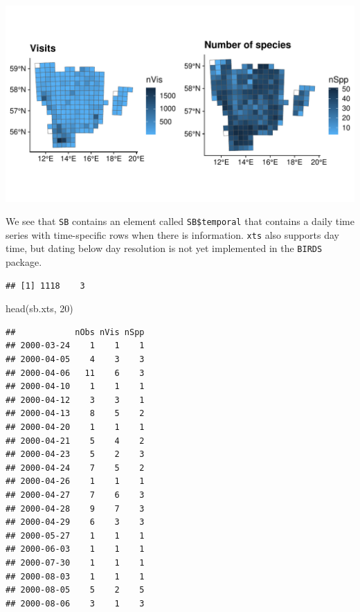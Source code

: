 \documentclass[
  10pt,
]{article}
\newenvironment{Shaded}{\begin{snugshade}}{\end{snugshade}}
\newcommand{\DecValTok}[1]{\textcolor[rgb]{0.00,0.00,0.81}{#1}}
\newcommand{\FunctionTok}[1]{\textcolor[rgb]{0.00,0.00,0.00}{#1}}
\newcommand{\NormalTok}[1]{#1}
\newcommand{\OtherTok}[1]{\textcolor[rgb]{0.56,0.35,0.01}{#1}}
\newcommand{\SpecialCharTok}[1]{\textcolor[rgb]{0.00,0.00,0.00}{#1}}
\begin{document}
\includegraphics{r-tools-tutorial_files/figure-latex/ggplot1-1.pdf}

We see that \texttt{SB} contains an element called \texttt{SB\$temporal} that contains a daily
time series with time-specific rows when there is information. \texttt{xts} also supports
day time, but dating below day resolution is not yet implemented in the \texttt{BIRDS} package.

\begin{Shaded}
\end{Shaded}

\begin{verbatim}
## [1] 1118    3
\end{verbatim}

\begin{Shaded}
\begin{Highlighting}[]
\FunctionTok{head}\NormalTok{(sb.xts, }\DecValTok{20}\NormalTok{)}
\end{Highlighting}
\end{Shaded}

\begin{verbatim}
##            nObs nVis nSpp
## 2000-03-24    1    1    1
## 2000-04-05    4    3    3
## 2000-04-06   11    6    3
## 2000-04-10    1    1    1
## 2000-04-12    3    3    1
## 2000-04-13    8    5    2
## 2000-04-20    1    1    1
## 2000-04-21    5    4    2
## 2000-04-23    5    2    3
## 2000-04-24    7    5    2
## 2000-04-26    1    1    1
## 2000-04-27    7    6    3
## 2000-04-28    9    7    3
## 2000-04-29    6    3    3
## 2000-05-27    1    1    1
## 2000-06-03    1    1    1
## 2000-07-30    1    1    1
## 2000-08-03    1    1    1
## 2000-08-05    5    2    5
## 2000-08-06    3    1    3
\end{verbatim}
\end{document}
